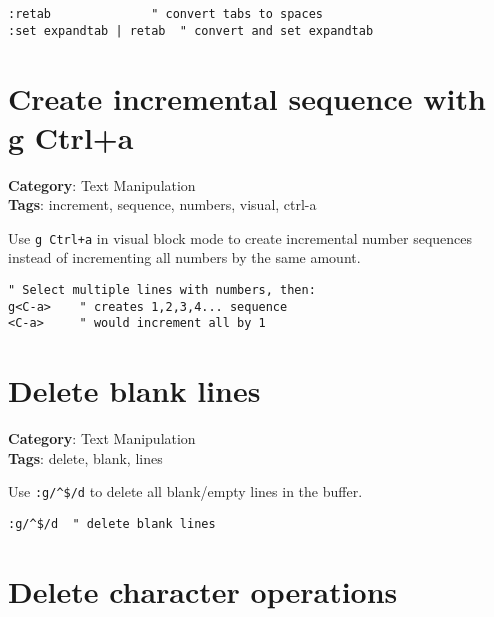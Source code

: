 {{{{{{{{{{{{{\begin{Exa*}{}
\begin{Verbatim}[fontsize=\footnotesize, breaklines, breakanywhere]
:retab              " convert tabs to spaces
:set expandtab | retab  " convert and set expandtab
\end{Verbatim}
\end{Exa*}

\section{Create incremental sequence with g Ctrl+a}

\textbf{Category}: Text Manipulation\\ \textbf{Tags}: increment, sequence, numbers, visual, ctrl-a
\vspace{0.5cm}

Use {\footnotesize \Verb§g Ctrl+a§} in visual block mode to create incremental number sequences instead of incrementing all numbers by the same amount.

\begin{Exa*}{}
\begin{Verbatim}[fontsize=\footnotesize, breaklines, breakanywhere]
" Select multiple lines with numbers, then:
g<C-a>    " creates 1,2,3,4... sequence
<C-a>     " would increment all by 1
\end{Verbatim}
\end{Exa*}

\section{Delete blank lines}

\textbf{Category}: Text Manipulation\\ \textbf{Tags}: delete, blank, lines
\vspace{0.5cm}

Use {\footnotesize \Verb§:g/^$/d§} to delete all blank/empty lines in the buffer.

\begin{Exa*}{}
\begin{Verbatim}[fontsize=\footnotesize, breaklines, breakanywhere]
:g/^$/d  " delete blank lines
\end{Verbatim}
\end{Exa*}

\section{Delete character operations}

}}}}}}}}}}}}}
